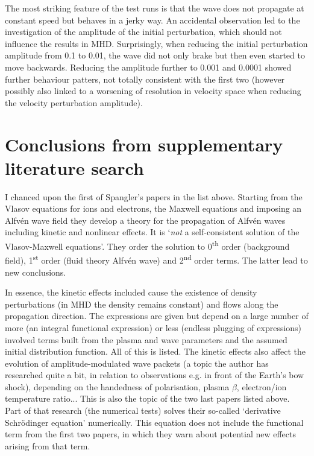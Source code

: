 \documentclass[a4paper,10pt]{scrartcl}
\begin{document}
The most striking feature of the test runs is that the wave does not propagate at constant speed but behaves in a jerky way. An accidental observation led to the investigation of the amplitude of the initial perturbation, which should not influence the results in MHD. Surprisingly, when reducing the initial perturbation amplitude from 0.1 to 0.01, the wave did not only brake but then even started to move backwards. Reducing the amplitude further to 0.001 and 0.0001 showed further behaviour patters, not totally consistent with the first two (however possibly also linked to a worsening of resolution in velocity space when reducing the velocity perturbation amplitude).


\section{Conclusions from supplementary literature search}
I chanced upon the first of Spangler's papers in the list above. Starting from the Vlasov equations for ions and electrons, the Maxwell equations and imposing an Alfvén wave field they develop a theory for the propagation of Alfvén waves including kinetic and nonlinear effects. It is `\textit{not} a self-consistent solution of the Vlasov-Maxwell equations'. They order the solution to 0\textsuperscript{th} order (background field), 1\textsuperscript{st} order (fluid theory Alfvén wave) and 2\textsuperscript{nd} order terms. The latter lead to new conclusions.

In essence, the kinetic effects included cause the existence of density perturbations (in MHD the density remains constant) and flows along the propagation direction. The expressions are given but depend on a large number of more (an integral functional expression) or less (endless plugging of expressions) involved terms built from the plasma and wave parameters and the assumed initial distribution function. All of this is listed. The kinetic effects also affect the evolution of amplitude-modulated wave packets (a topic the author has researched quite a bit, in relation to observations e.g. in front of the Earth's bow shock), depending on the handedness of polarisation, plasma $\beta$, electron/ion temperature ratio... This is also the topic of the two last papers listed above. Part of that research (the numerical tests) solves their so-called `derivative Schrödinger equation' numerically. This equation does not include the functional term from the first two papers, in which they warn about potential new effects arising from that term.
\end{document}

